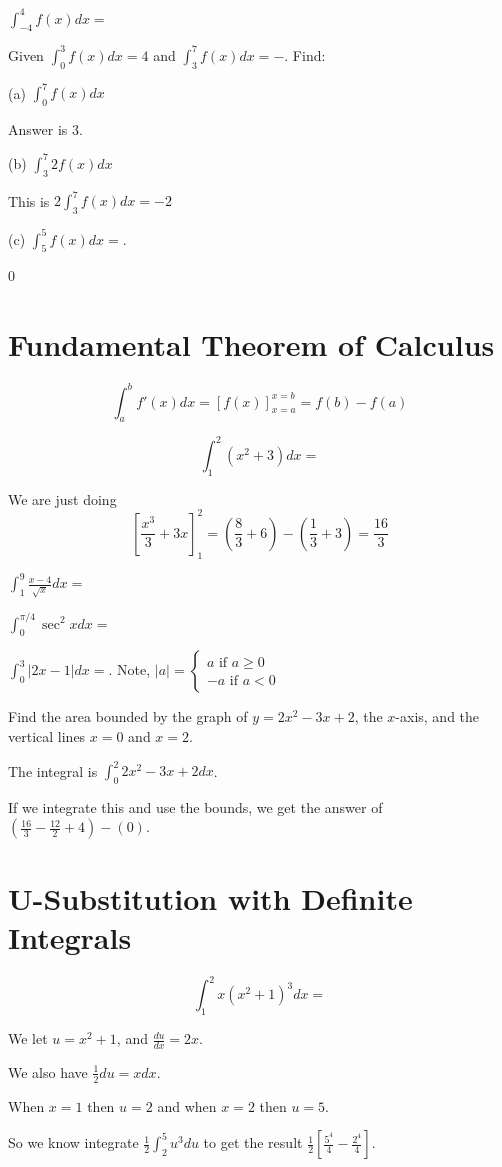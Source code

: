 \documentclass[../bccalc.tex]{subfiles}
\begin{document}
\ex $\int_{-4}^4 f(x)dx = $

\begin{example}
    Given $\int_0^3 f(x)dx=4$ and $\int_3^7 f(x)dx=-$. Find:

    (a) $\int_0^7 f(x)dx$

    Answer is 3.

    (b) $\int_3^7 2f(x)dx$ 

    This is $2\int_3^7 f(x)dx = -2$

    (c) $\int_5^5 f(x)dx=$.

    0
\end{example}

\section{Fundamental Theorem of Calculus}
\begin{theorem}
    \[ \int_a^b f'(x)dx= [f(x)]^{x=b}_{x=a}=f(b)-f(a) \]
\end{theorem}

\begin{example}
    \[ \int_1^2 (x^2+3)dx = \]

    We are just doing 
    \[ \left[ \frac{x^3}{3}+3x\right]^2_1 = \left(\frac{8}{3}+6\right)-\left(\frac{1}{3}+3\right) = \frac{16}{3}\]
\end{example}

\ex $\int_1^9 \frac{x-4}{\sqrt{x}}dx=$

\ex $\int_0^{\pi/4}\sec^2 xdx=$

\ex $\int_0^3 |2x-1|dx =$.
Note, $|a|=\begin{cases}
    a \text{ if } a\geq 0 \\
    -a \text{ if }a<0
\end{cases}$

\begin{example}
    Find the area bounded by the graph of $y=2x^2-3x+2$, the $x$-axis, and the vertical lines $x=0$ and $x=2$.

    The integral is $\int_0^2 2x^2-3x+2dx$.

    If we integrate this and use the bounds, we get the answer of $\left(\frac{16}{3}-\frac{12}{2}+4\right)-(0)$.
\end{example}
\pagebreak
\section{U-Substitution with Definite Integrals}
\begin{example}
    \[ \int_1^2 x(x^2+1)^3 dx = \]

    We let $u=x^2+1$, and $\frac{du}{dx}=2x$.

    We also have $\frac{1}{2}du=xdx$.

    When $x=1$ then $u=2$ and when $x=2$ then $u=5$.

    So we know integrate $\frac{1}{2}\int_2^5 u^3 du$ to get the result $\frac{1}{2}\left[\frac{5^4}{4}-\frac{2^4}{4}\right]$.
\end{example}
\end{document}
